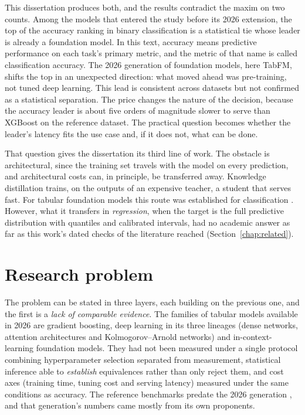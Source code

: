 This dissertation produces both, and the results contradict the maxim
on two counts. Among the models that entered the study before its 2026 extension,
the top of the accuracy ranking in binary classification is a
statistical tie whose leader is already a foundation model. In this text, accuracy means predictive performance on each task's primary metric, and the metric of that name is called classification accuracy. The 2026 generation of foundation models, here TabFM, shifts the top in an unexpected direction: what moved
ahead was pre-training, not tuned deep learning. This lead is consistent
across datasets but
not confirmed as a statistical separation. The price changes the
nature of the decision, because the accuracy leader is about five
orders of magnitude slower to serve than XGBoost on the reference
dataset. The practical question becomes whether the leader's latency
fits the use case and, if it does not, what can be done.

That question gives the dissertation its third line of work. The
obstacle is architectural, since the training set travels with the
model on every prediction, and architectural costs can, in principle,
be transferred away. Knowledge distillation \citep{hinton2015}
trains, on the outputs of an expensive teacher, a student that serves
fast. For tabular foundation models this route was established for
classification \citep{pocketfm2026}. However, what it transfers in
\emph{regression}, when the target is the full predictive
distribution with quantiles and calibrated intervals, had no academic
answer as far as this work's dated checks of the literature reached (Section~\ref{chap:related}).

\section{Research problem}
\label{sec:intro-problema}

The problem can be stated in three layers, each building on the
previous one, and the first is a \emph{lack of comparable evidence}. The
families of tabular models available in 2026 are gradient boosting,
deep learning in its three lineages (dense networks, attention
architectures and Kolmogorov--Arnold networks) and
in-context-learning foundation models. They had not been measured under
a single protocol combining hyperparameter selection separated from
measurement, statistical inference able to
\emph{establish} equivalences rather than only reject them, and cost
axes (training time, tuning cost and serving latency) measured under the
same conditions as accuracy. The reference
benchmarks predate the 2026 generation
\citep{grinsztajn2022,mcelfresh2023}, and that generation's numbers
came mostly from its own proponents.

